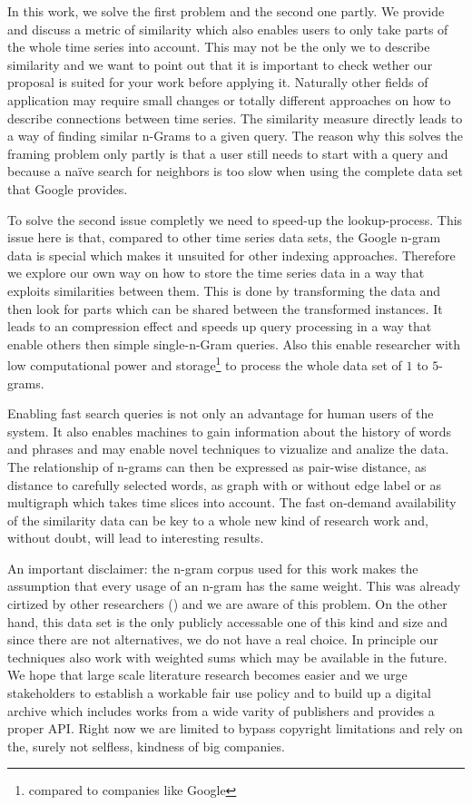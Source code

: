 In this work, we solve the first problem and the second one partly. We provide and discuss a metric of similarity which also enables users to only take parts of the whole time series into account. This may not be the only we to describe similarity and we want to point out that it is important to check wether our proposal is suited for your work before applying it. Naturally other fields of application may require small changes or totally different approaches on how to describe connections between time series. The similarity measure directly leads to a way of finding similar n-Grams to a given query. The reason why this solves the framing problem only partly is that a user still needs to start with a query and because a na{\"i}ve search for neighbors is too slow when using the complete data set that Google provides.

To solve the second issue completly we need to speed-up the lookup-process. This issue here is that, compared to other time series data sets, the Google n-gram data is special which makes it unsuited for other indexing approaches. Therefore we explore our own way on how to store the time series data in a way that exploits similarities between them. This is done by transforming the data and then look for parts which can be shared between the transformed instances. It leads to an compression effect and speeds up query processing in a way that enable others then simple single-n-Gram queries. Also this enable researcher with low computational power and storage\footnote{compared to companies like Google} to process the whole data set of $1$ to $5$-grams.

Enabling fast search queries is not only an advantage for human users of the system. It also enables machines to gain information about the history of words and phrases and may enable novel techniques to vizualize and analize the data. The relationship of n-grams can then be expressed as pair-wise distance, as distance to carefully selected words, as graph with or without edge label or as multigraph which takes time slices into account. The fast on-demand availability of the similarity data can be key to a whole new kind of research work and, without doubt, will lead to interesting results.

An important disclaimer: the n-gram corpus used for this work makes the assumption that every usage of an n-gram has the same weight. This was already cirtized by other researchers (\cite{countbad}) and we are aware of this problem. On the other hand, this data set is the only publicly accessable one of this kind and size and since there are not alternatives, we do not have a real choice. In principle our techniques also work with weighted sums which may be available in the future. We hope that large scale literature research becomes easier and we urge stakeholders to establish a workable fair use policy and to build up a digital archive which includes works from a wide varity of publishers and provides a proper API\@. Right now we are limited to bypass copyright limitations and rely on the, surely not selfless, kindness of big companies.

